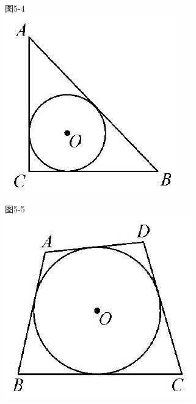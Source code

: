 \documentclass[10pt]{article}
\begin{document}
图5-4\\
\includegraphics[max width=\textwidth, center]{2024_10_30_66b8e5e701da2093c133g-035}

图5-5\\
\includegraphics[max width=\textwidth, center]{2024_10_30_66b8e5e701da2093c133g-035(4)}
\end{document}
